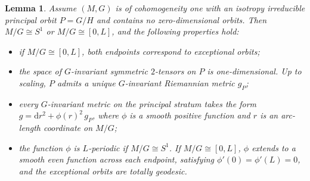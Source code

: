 \documentclass[12pt,a4paper]{amsart}
\theoremstyle{plain}
\newtheorem{lemma}[theorem]{Lemma}
\theoremstyle{definition}
\theoremstyle{remark}
\newcommand{\ga}{\mathit{g}} %
\begin{document}
\begin{lemma}\label{lem:smooth}
Assume $(M,G)$ is of cohomogeneity one with an isotropy irreducible principal orbit $P=G/H$ and contains no zero-dimensional orbits. Then $M/G \cong S^1$ or $M/G \cong [0,L]$, and the following properties hold:
\begin{itemize}
  \item[$(\mathrm{i})$] if $M/G \cong [0,L]$, both endpoints correspond to exceptional orbits;
  \item[$(\mathrm{ii})$] the space of $G$-invariant symmetric $2$-tensors on $P$ is one-dimensional. Up to scaling, $P$ admits a unique $G$-invariant Riemannian metric $\ga_P$;
  \item[$(\mathrm{iii})$] every $G$-invariant metric on the principal stratum takes the form $\ga = \mathrm{d}r^2 + \phi(r)^2\,\ga_P$, where $\phi$ is a smooth positive function and $r$ is an arc-length coordinate on $M/G$;
  \item[$(\mathrm{iv})$] the function $\phi$ is $L$-periodic if $M/G \cong S^1$. If $M/G \cong [0, L]$, $\phi$ extends to a smooth even function across each endpoint, satisfying $\phi'(0) = \phi'(L) = 0$, and the exceptional orbits are totally geodesic.
\end{itemize}
\end{lemma}
\end{document}
